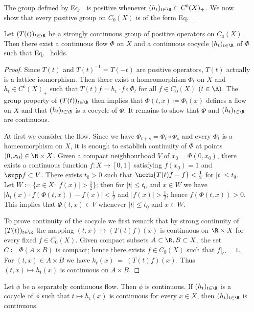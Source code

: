 The group defined by Eq.~ is positive whenever $(h_t)_{t \in \R} \subset C^{b} (X)_+$.
We now show that every positive group on $C_0(X)$ is of the form Eq.~.
\begin{proposition}\label{prop:b2-3.9}
Let $(T(t))_{t \in \R}$ be a strongly continuous group of positive operators on $C_0(X)$.
Then there exist a continuous flow $\Phi$ on $X$ and a continuous cocycle $(h_t)_{t \in \R}$ of\/ $\Phi$ such that Eq.~ holds.
\end{proposition}
\begin{proof}
Since $T(t)$ and $T(t)^{-1} = T(-t)$ are positive operators, $T(t)$ actually is a lattice isomorphism.
Then there exist a homeomorphism $\Phi_t$ on $X$ and $h_t \in C^{b}(X)_+$ such that $T(t)f = h_t \cdot f \circ \Phi_t$ for all $f \in C_0(X)$ $(t \in \R)$.
The group property of\/ $(T(t))_{t \in \R}$ then implies that $\Phi(t,x) \coloneqq \Phi_t(x)$ defines a flow on $X$ and that $(h_t)_{t \in \R}$ is a cocycle of\/ $\Phi$.
It remains to show that $\Phi$ and $(h_t)_{t \in \R}$ are continuous.

At first we consider the flow.
Since we have $\Phi_{t+s} = \Phi_t \circ \Phi_s$ and every $\Phi_t$ is a homeomorphism on $X$, it is enough to establish continuity of\/ $\Phi$ at points $(0,x_0) \in \R \times X$.
Given a compact neighbourhood $V$ of\/ $x_0 = \Phi (0,x_0)$, there exists a continuous function $f \colon X \to [0,1]$ satisfying $f(x_0) = 1$ and $\supp f \subset V$.
There exists $t_0 > 0$ such that $\norm{T(t)f - f} < \frac{1}{2}$ for $|t| \leq t_0$.
Let $W \coloneqq \{x \in X \colon |f(x)| > \frac{1}{2}\}$; then for $|t| \leq t_0$ and $x \in W$ we have $|h_t(x) \cdot f(\Phi(t,x)) - f(x)| < \frac{1}{2}$ and $|f(x)| > \frac{1}{2}$; hence $f(\Phi (t,x)) > 0$.
This implies that $\Phi (t,x) \in V$ whenever $|t| \leq t_0$ and $x \in W$.

To prove continuity of the cocycle we first remark that by strong continuity of\/ $(T(t))_{t \in \R}$ the mapping $(t,x) \mapsto (T(t)f) (x)$ is continuous on $\R \times X$ for every fixed $f \in C_0(X)$.
Given compact subsets $A \subset \R , B \subset X$, the set $C \coloneqq \Phi(A \times B)$ is compact; hence there exists $f \in C_0(X)$ such that $f|_{C} = 1$.
For $(t,x) \in A \times B$ we have $h_t(x)~=~(T(t)f) (x)$.
Thus $(t,x) \mapsto h_t(x)$ is continuous on $A \times B$.
\end{proof}

\begin{corollary}\label{cor:b2-3.10}
Let $\phi$ be a separately continuous flow.
Then $\phi$ is continuous.
If\/ $(h_t)_{t \in \R}$ is a cocycle of\/ $\phi$ such that $t \mapsto h_t (x)$ is continuous for every $x \in X$, then $(h_t)_{t \in \R}$ is continuous.
\end{corollary}

